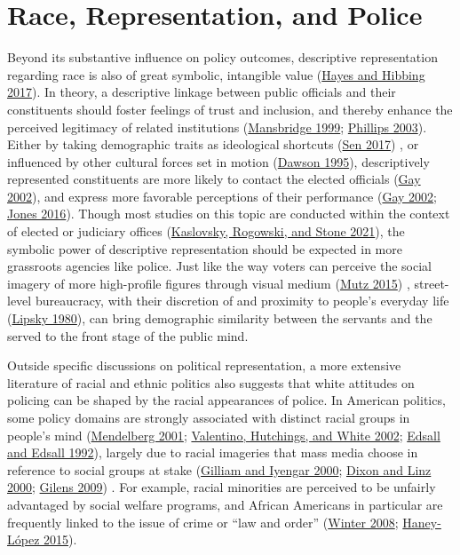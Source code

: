 \documentclass[
  12pt,
]{article}
\begin{document}
\hypertarget{race-representation-and-police}{%
\section{Race, Representation, and
Police}\label{race-representation-and-police}}

Beyond its substantive influence on policy outcomes, descriptive
representation regarding race is also of great symbolic, intangible
value (\protect\hyperlink{ref-hayes2017}{Hayes and Hibbing 2017}). In
theory, a descriptive linkage between public officials and their
constituents should foster feelings of trust and inclusion, and thereby
enhance the perceived legitimacy of related institutions
(\protect\hyperlink{ref-mansbridge1999}{Mansbridge 1999};
\protect\hyperlink{ref-phillips2003}{Phillips 2003}). Either by taking
demographic traits as ideological shortcuts
(\protect\hyperlink{ref-sen2017}{Sen 2017}) , or influenced by other
cultural forces set in motion (\protect\hyperlink{ref-dawson1995}{Dawson
1995}), descriptively represented constituents are more likely to
contact the elected officials (\protect\hyperlink{ref-gay2002}{Gay
2002}), and express more favorable perceptions of their performance
(\protect\hyperlink{ref-gay2002}{Gay 2002};
\protect\hyperlink{ref-jones2016}{Jones 2016}). Though most studies on
this topic are conducted within the context of elected or judiciary
offices (\protect\hyperlink{ref-kaslovsky2021}{Kaslovsky, Rogowski, and
Stone 2021}), the symbolic power of descriptive representation should be
expected in more grassroots agencies like police. Just like the way
voters can perceive the social imagery of more high-profile figures
through visual medium (\protect\hyperlink{ref-mutz2015}{Mutz 2015}) ,
street-level bureaucracy, with their discretion of and proximity to
people's everyday life (\protect\hyperlink{ref-lipsky1980}{Lipsky
1980}), can bring demographic similarity between the servants and the
served to the front stage of the public mind.

Outside specific discussions on political representation, a more
extensive literature of racial and ethnic politics also suggests that
white attitudes on policing can be shaped by the racial appearances of
police. In American politics, some policy domains are strongly
associated with distinct racial groups in people's mind
(\protect\hyperlink{ref-mendelberg2001}{Mendelberg 2001};
\protect\hyperlink{ref-valentino2002}{Valentino, Hutchings, and White
2002}; \protect\hyperlink{ref-edsall1992}{Edsall and Edsall 1992}),
largely due to racial imageries that mass media choose in reference to
social groups at stake (\protect\hyperlink{ref-gilliam2000}{Gilliam and
Iyengar 2000}; \protect\hyperlink{ref-dixon2000}{Dixon and Linz 2000};
\protect\hyperlink{ref-gilens2009}{Gilens 2009}) . For example, racial
minorities are perceived to be unfairly advantaged by social welfare
programs, and African Americans in particular are frequently linked to
the issue of crime or ``law and order''
(\protect\hyperlink{ref-winter2008}{Winter 2008};
\protect\hyperlink{ref-haney-luxf3pez2015}{Haney-López 2015}).
\end{document}
